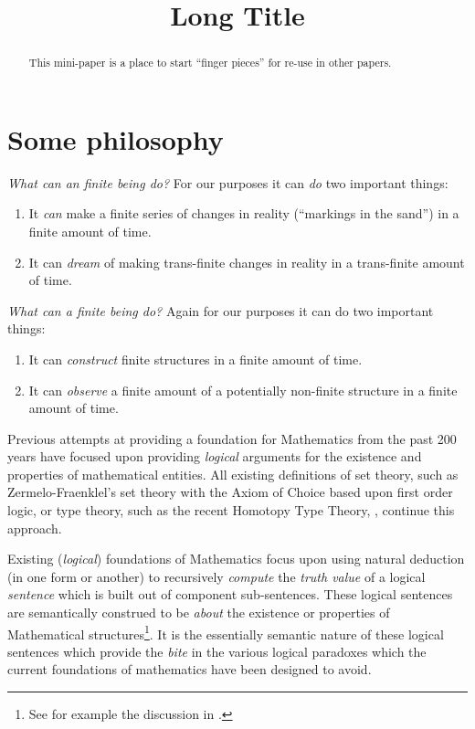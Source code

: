 \documentclass[a4paper,openany]{amsart}
\begin{document}
\sloppy

\title[Short Title]{Long Title}

%

\begin{abstract}
This mini-paper is a place to start ``finger pieces'' for re-use in other
papers.
\end{abstract} 
\maketitle 
\tableofcontents 


\section{Some philosophy}

\emph{What can an finite being do?} For our purposes it can \emph{do} two
important things:
\begin{enumerate}
\item It \emph{can} make a finite series of changes in reality (``markings in
the sand'') in a finite amount of time.
\item It can \emph{dream} of making trans-finite changes in reality in a
trans-finite amount of time.
\end{enumerate}

\emph{What can a finite being do?} Again for our purposes it can do two
important things:
\begin{enumerate}
\item It can \emph{construct} finite structures in a finite amount of time.
\item It can \emph{observe} a finite amount of a potentially non-finite
structure in a finite amount of time.
\end{enumerate}

Previous attempts at providing a foundation for Mathematics from the past 200
years have focused upon providing \emph{logical} arguments for the existence and
properties of mathematical entities. All existing definitions of set theory, such
as Zermelo-Fraenklel's set theory with the Axiom of Choice based upon first
order logic, or type theory, such as the recent Homotopy Type Theory,
\cite{awodeyCoquandVoevodsky2013homotopyTypeTheory}, continue this approach.

Existing (\emph{logical}) foundations of Mathematics focus upon using natural
deduction (in one form or another) to recursively \emph{compute} the \emph{truth
value} of a logical \emph{sentence} which is built out of component
sub-sentences. These logical sentences are semantically construed to be
\emph{about} the existence or properties of Mathematical structures\footnote{See
for example the discussion in \cite{hatcher1982logicalFoundationsMath}.}. It is
the essentially semantic nature of these logical sentences which provide the
\emph{bite} in the various logical paradoxes which the current foundations of
mathematics have been designed to avoid.
\end{document}
